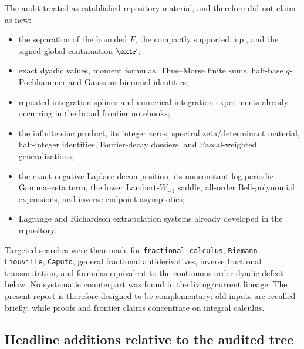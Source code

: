 \documentclass[11pt,oneside]{article}
\theoremstyle{definition}
\theoremstyle{remark}
\newcommand{\Up}{\operatorname{up}}
\newcommand{\1}{\mathbf 1}
\begin{document}
The audit treated as established repository material, and therefore did not claim as new:
\begin{itemize}
\item the separation of the bounded $F$, the compactly supported $\Up$, and the signed global
      continuation $\extF$;
\item exact dyadic values, moment formulas, Thue--Morse finite sums, half-base
      $q$-Pochhammer and Gaussian-binomial identities;
\item repeated-integration splines and numerical integration experiments already occurring in
      the broad frontier notebooks;
\item the infinite sinc product, its integer zeros, spectral zeta/determinant material,
      half-integer identities, Fourier-decay dossiers, and Pascal-weighted generalizations;
\item the exact negative-Laplace decomposition, its nonconstant log-periodic Gamma--zeta term,
      the lower Lambert-$W_{-1}$ saddle, all-order Bell-polynomial expansions, and inverse
      endpoint asymptotics;
\item Lagrange and Richardson extrapolation systems already developed in the repository.
\end{itemize}

Targeted searches were then made for \texttt{fractional calculus},
\texttt{Riemann--Liouville}, \texttt{Caputo}, general fractional antiderivatives, inverse
fractional transmutation, and formulas equivalent to the continuous-order dyadic defect below.
No systematic counterpart was found in the living/current lineage.  The present report is
therefore designed to be complementary: old inputs are recalled briefly, while proofs and
frontier claims concentrate on integral calculus.

\subsection{Headline additions relative to the audited tree}
\end{document}
